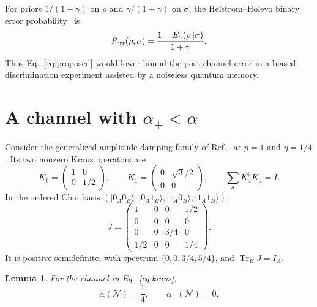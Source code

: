 \documentclass[11pt]{article}
\newtheorem{lemma}{Lemma}
\newcommand{\cN}{\mathcal N}
\newcommand{\Tr}{\operatorname{Tr}}
\newcommand{\ket}[1]{\lvert #1\rangle}
\begin{document}
For priors $1/(1+\gamma)$ on $\rho$ and $\gamma/(1+\gamma)$ on $\sigma$,
the Helstrom--Holevo binary error probability~\cite{Helstrom1967,Holevo1973}
is
\begin{equation}
 P_{\rm err}(\rho,\sigma)=\frac{1-E_\gamma(\rho\Vert\sigma)}{1+\gamma}.
 \label{eq:perr}
\end{equation}
Thus Eq.~\eqref{eq:proposed} would lower-bound the post-channel error in a
biased discrimination experiment assisted by a noiseless quantum memory.

\section{A channel with \texorpdfstring{$\alpha_+<\alpha$}{alpha-plus less than alpha}}

Consider the generalized amplitude-damping family of
Ref.~\cite[Lemma~10]{GeorgeEtAl2026} at $p=1$ and $\eta=1/4$.  Its two
nonzero Kraus operators are
\begin{equation}
 K_0=\begin{pmatrix}1&0\\0&1/2\end{pmatrix},\qquad
 K_1=\begin{pmatrix}0&\sqrt3/2\\0&0\end{pmatrix},
 \qquad \sum_aK_a^\dagger K_a=I.
 \label{eq:kraus}
\end{equation}
In the ordered Choi basis
$(\ket{0_A0_B},\ket{0_A1_B},\ket{1_A0_B},\ket{1_A1_B})$,
\begin{equation}
 J=\begin{pmatrix}
 1&0&0&1/2\\
 0&0&0&0\\
 0&0&3/4&0\\
 1/2&0&0&1/4
 \end{pmatrix}.
 \label{eq:J}
\end{equation}
It is positive semidefinite, with spectrum
$\{0,0,3/4,5/4\}$, and $\Tr_BJ=I_A$.

\begin{lemma}
For the channel in Eq.~\eqref{eq:kraus},
\begin{equation}
 \alpha(\cN)=\frac14,\qquad \alpha_+(\cN)=0.
 \label{eq:coefficients}
\end{equation}
\end{lemma}
\end{document}
